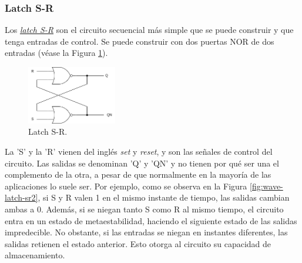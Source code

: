 \subsubsection{Latch S-R}

Los \hyperlink{sr_latch}{\emph{latch S-R}} son el circuito secuencial más simple que se puede construir y que tenga entradas de control. Se puede construir con dos puertas NOR de dos entradas (véase la Figura \ref{fig:latch-sr}). 

\begin{figure}
    \centering
    \includegraphics[width=0.35\textwidth]{figs/latch-sr.drawio.png}
    \caption{Latch S-R.}
    \label{fig:latch-sr}
\end{figure}

La 'S' y la 'R' vienen del inglés \emph{set} y \emph{reset}, y son las señales de control del circuito. Las salidas se denominan 'Q' y 'QN' y no tienen por qué ser una el complemento de la otra, a pesar de que normalmente en la mayoría de las aplicaciones lo suele ser. Por ejemplo, como se observa en la Figura \ref{fig:wave-latch-sr2}, si S y R valen 1 en el mismo instante de tiempo, las salidas cambian ambas a 0. Además, si se niegan tanto S como R al mismo tiempo, el circuito entra en un estado de metaestabilidad, haciendo el siguiente estado de las salidas impredecible. No obstante, si las entradas se niegan en instantes diferentes, las salidas retienen el estado anterior. Esto otorga al circuito su capacidad de almacenamiento.

